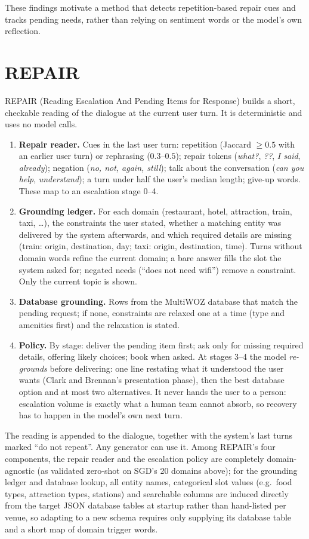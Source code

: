 \documentclass[11pt]{article}
\begin{document}
These findings motivate a method that detects repetition-based repair cues and tracks pending needs, rather
than relying on sentiment words or the model's own reflection.

\section{REPAIR}
\label{sec:method}
REPAIR (Reading Escalation And Pending Items for Response) builds a short, checkable reading of the
dialogue at the current user turn. It is deterministic and uses no model calls.
\begin{enumerate}
\item \textbf{Repair reader.} Cues in the last user turn: repetition (Jaccard $\ge 0.5$ with an earlier user
turn) or rephrasing ($0.3$--$0.5$); repair tokens (\emph{what?}, \emph{??}, \emph{I said}, \emph{already});
negation (\emph{no, not, again, still}); talk about the conversation (\emph{can you help}, \emph{understand});
a turn under half the user's median length; give-up words. These map to an escalation stage 0--4.
\item \textbf{Grounding ledger.} For each domain (restaurant, hotel, attraction, train, taxi, \ldots), the
constraints the user stated, whether a matching entity was delivered by the system afterwards, and which
required details are missing (train: origin, destination, day; taxi: origin, destination, time). Turns
without domain words refine the current domain; a bare answer fills the slot the system asked for; negated
needs (``does not need wifi'') remove a constraint. Only the current topic is shown.
\item \textbf{Database grounding.} Rows from the MultiWOZ database that match the pending request; if none,
constraints are relaxed one at a time (type and amenities first) and the relaxation is stated.
\item \textbf{Policy.} By stage: deliver the pending item first; ask only for missing required details, offering
likely choices; book when asked. At stages 3--4 the model \emph{re-grounds} before delivering: one line
restating what it understood the user wants (Clark and Brennan's presentation phase), then the best database
option and at most two alternatives. It never hands the user to a person: escalation volume is exactly what a
human team cannot absorb, so recovery has to happen in the model's own next turn.
\end{enumerate}
The reading is appended to the dialogue, together with the system's last turns marked ``do not repeat''.
Any generator can use it. Among REPAIR's four components, the repair reader and the escalation policy are
completely domain-agnostic (as validated zero-shot on SGD's 20 domains above); for the grounding ledger and
database lookup, all entity names, categorical slot values (e.g.\ food types, attraction types, stations) and
searchable columns are induced directly from the target JSON database tables at startup rather than
hand-listed per venue, so adapting to a new schema requires only supplying its database table and a short map
of domain trigger words.
\end{document}
